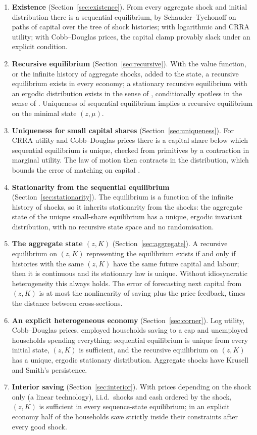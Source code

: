 \begin{enumerate}[leftmargin=*,itemsep=2pt]
\item \textbf{Existence} (Section~\ref{sec:existence}). From every aggregate shock and initial
  distribution there is a sequential equilibrium, by Schauder--Tychonoff on paths of capital over
  the tree of shock histories; with logarithmic and CRRA utility; with Cobb--Douglas prices, the
  capital clamp provably slack under an explicit condition.
\item \textbf{Recursive equilibrium} (Section~\ref{sec:recursive}). With the value function, or
  the infinite history of aggregate shocks, added to the state, a recursive equilibrium exists in
  every economy; a stationary recursive equilibrium with an ergodic distribution exists in the
  sense of \citet{dgmm1994}, conditionally spotless in the sense of \citet{cao2020}. Uniqueness of
  sequential equilibrium implies a recursive equilibrium on the minimal state $(z,\mu)$.
\item \textbf{Uniqueness for small capital shares} (Section~\ref{sec:uniqueness}). For CRRA utility
  and Cobb--Douglas prices there is a capital share below which sequential equilibrium is unique,
  checked from primitives by a contraction in marginal utility. The law of motion then contracts in
  the distribution, which bounds the error of matching on capital \citep{lee2026}.
\item \textbf{Stationarity from the sequential equilibrium} (Section~\ref{sec:stationarity}). The
  equilibrium is a function of the infinite history of shocks, so it inherits stationarity from
  the shocks: the aggregate state of the unique small-share equilibrium has a unique, ergodic
  invariant distribution, with no recursive state space and no randomisation.
\item \textbf{The aggregate state $(z,K)$} (Section~\ref{sec:aggregate}). A recursive equilibrium on
  $(z,K)$ representing the equilibrium exists if and only if histories with the same $(z,K)$ have
  the same future capital and labour; then it is continuous and its stationary law is unique.
  Without idiosyncratic heterogeneity this always holds. The error of
  forecasting next capital from $(z,K)$ is at most the nonlinearity of saving plus the price
  feedback, times the distance between cross-sections.
\item \textbf{An explicit heterogeneous economy} (Section~\ref{sec:corner}). Log utility,
  Cobb--Douglas prices, employed households saving to a cap and unemployed households spending
  everything: sequential equilibrium is unique from every initial state, $(z,K)$ is sufficient, and
  the recursive equilibrium on $(z,K)$ has a unique, ergodic stationary distribution. Aggregate
  shocks have Krusell and Smith's persistence.
\item \textbf{Interior saving} (Section~\ref{sec:interior}). With prices depending on the shock
  only (a linear technology), i.i.d.\ shocks and cash ordered by the shock, $(z,K)$ is sufficient in
  every sequence-state equilibrium; in an explicit economy half of the households save strictly
  inside their constraints after every good shock.
\end{enumerate}

